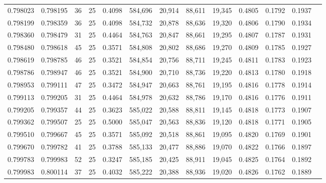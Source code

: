 \begin{tabular}{rrrrrrrrrrrrr}
0.798023 & 0.798195 &    36 &  25 &                                     0.4098 & 584,696 &  20,914 &  88,611 &  19,345 & 0.4805 & 0.1792 & 0.1937 \\
0.798199 & 0.798359 &    36 &  25 &                                     0.4098 & 584,732 &  20,878 &  88,636 &  19,320 & 0.4806 & 0.1790 & 0.1934 \\
0.798360 & 0.798479 &    31 &  25 &                                     0.4464 & 584,763 &  20,847 &  88,661 &  19,295 & 0.4807 & 0.1787 & 0.1931 \\
0.798480 & 0.798618 &    45 &  25 &                                     0.3571 & 584,808 &  20,802 &  88,686 &  19,270 & 0.4809 & 0.1785 & 0.1927 \\
0.798619 & 0.798785 &    46 &  25 &                                     0.3521 & 584,854 &  20,756 &  88,711 &  19,245 & 0.4811 & 0.1783 & 0.1923 \\
0.798786 & 0.798947 &    46 &  25 &                                     0.3521 & 584,900 &  20,710 &  88,736 &  19,220 & 0.4813 & 0.1780 & 0.1918 \\
0.798953 & 0.799111 &    47 &  25 &                                     0.3472 & 584,947 &  20,663 &  88,761 &  19,195 & 0.4816 & 0.1778 & 0.1914 \\
0.799113 & 0.799205 &    31 &  25 &                                     0.4464 & 584,978 &  20,632 &  88,786 &  19,170 & 0.4816 & 0.1776 & 0.1911 \\
0.799205 & 0.799357 &    44 &  25 &                                     0.3623 & 585,022 &  20,588 &  88,811 &  19,145 & 0.4818 & 0.1773 & 0.1907 \\
0.799362 & 0.799507 &    25 &  25 &                                     0.5000 & 585,047 &  20,563 &  88,836 &  19,120 & 0.4818 & 0.1771 & 0.1905 \\
0.799510 & 0.799667 &    45 &  25 &                                     0.3571 & 585,092 &  20,518 &  88,861 &  19,095 & 0.4820 & 0.1769 & 0.1901 \\
0.799670 & 0.799782 &    41 &  25 &                                     0.3788 & 585,133 &  20,477 &  88,886 &  19,070 & 0.4822 & 0.1766 & 0.1897 \\
0.799783 & 0.799983 &    52 &  25 &                                     0.3247 & 585,185 &  20,425 &  88,911 &  19,045 & 0.4825 & 0.1764 & 0.1892 \\
0.799983 & 0.800114 &    37 &  25 &                                     0.4032 & 585,222 &  20,388 &  88,936 &  19,020 & 0.4826 & 0.1762 & 0.1889 \\

\end{tabular}

